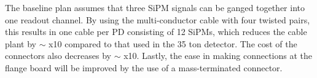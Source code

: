 The baseline plan assumes that three SiPM signals can be ganged 
together into one readout channel. 
By using the multi-conductor cable with four twisted pairs, this 
results in one cable per PD consisting of 12 SiPMs, which reduces the 
cable plant by $\sim$ x10 compared to that used in the 35 ton detector.  
The cost of the connectors also decreases by $\sim$ x10.  
Lastly, the ease in making connections at the flange board will be improved 
by the use of a mass-terminated connector.      

